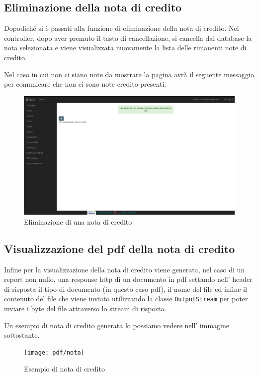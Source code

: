 \documentclass[12pt]{book}
\begin{document}
\subsection{Eliminazione della nota di credito}
Dopodiché si è passati alla funzione di eliminazione della nota di credito.
Nel controller, dopo aver premuto il tasto di cancellazione, 
si cancella dal database la nota selezionata e viene
visualizzata nuovamente la lista delle rimanenti note di credito.

Nel caso in cui non ci siano note da mostrare la pagina avrà il seguente 
messaggio per comunicare che non ci sono note credito presenti.
\begin{figure}[H]
    \centering
    \includegraphics[scale=0.4]{img/eliminazione_nota_credito}
    \caption{Eliminazione di una nota di credito}\label{fig:eliminazione}
\end{figure}
\subsection{Visualizzazione del pdf della nota di credito}
Infine per la visualizzazione della nota di credito viene generata, nel 
caso di un report non nullo, una response http di un documento in pdf
settando nell' header di risposta il tipo di documento (in questo caso pdf),
il nome del file ed infine il contenuto del file che viene inviato utilizzando
la classe \texttt{OutputStream} per poter inviare i byte del file attraverso 
lo stream di risposta.

Un esempio di nota di credito generata lo possiamo vedere nell' immagine 
sottostante.
\begin{figure}[H]
    \centering
    \texttt{[image: pdf/nota]}
    \caption{Esempio di nota di credito}\label{fig:nota}
\end{figure}
\clearpage
\end{document}
